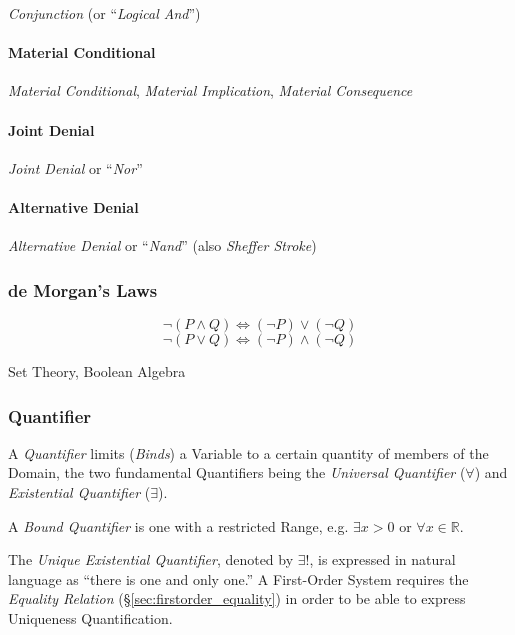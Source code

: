 \emph{Conjunction} (or ``\emph{Logical And}'')



\paragraph{Material Conditional}\label{sec:material_conditional}\hfill

\emph{Material Conditional}, \emph{Material Implication},
\emph{Material Consequence}



\paragraph{Joint Denial}\label{sec:joint_denial}\hfill

\emph{Joint Denial} or ``\emph{Nor}''



\paragraph{Alternative Denial}\label{sec:alternative_denial}\hfill

\emph{Alternative Denial} or ``\emph{Nand}'' (also \emph{Sheffer
  Stroke})



\subsubsection{de Morgan's Laws}\label{sec:de_morgan}

\[
  \neg (P \wedge Q) \Leftrightarrow (\neg P) \vee (\neg Q)
\] \[
  \neg (P \vee Q) \Leftrightarrow (\neg P) \wedge (\neg Q)
\]

Set Theory, Boolean Algebra



\subsubsection{Quantifier}\label{sec:quantifier}

A \emph{Quantifier} limits (\emph{Binds}) a Variable to a certain
quantity of members of the Domain, the two fundamental Quantifiers
being the \emph{Universal Quantifier} ($\forall$) and
\emph{Existential Quantifier} ($\exists$).

A \emph{Bound Quantifier} is one with a restricted Range, e.g.
$\exists x > 0$ or $\forall x \in \mathbb{R}$.

The \emph{Unique Existential Quantifier}, denoted by $\exists !$, is
expressed in natural language as ``there is one and only one.'' A
First-Order System requires the \emph{Equality Relation}
(\S\ref{sec:firstorder_equality}) in order to be able to express
Uniqueness Quantification.



